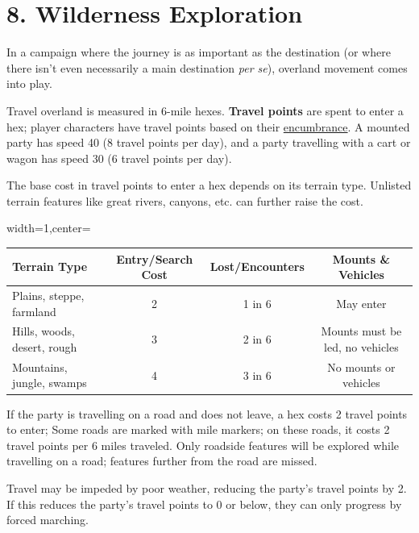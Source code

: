 \documentclass{book}
\begin{document}
\newpage

\section*{8. Wilderness Exploration}\label{wilderness-exploration}

In a campaign where the journey is as important as the destination (or
where there isn't even necessarily a main destination \emph{per se}),
overland movement comes into play.

Travel overland is measured in 6-mile hexes. \textbf{Travel points} are
spent to enter a hex; player characters have travel points based on
their \hyperref[item-slots]{encumbrance}. A mounted party has speed 40
(8 travel points per day), and a party travelling with a cart or wagon
has speed 30 (6 travel points per day).

The base cost in travel points to enter a hex depends on its terrain
type. Unlisted terrain features like great rivers, canyons, etc. can
further raise the cost.

\begin{table}[ht]
	\centering
	\begin{adjustbox}{width=1\textwidth,center=\textwidth}
	\begin{tabular}{lccc}
		\toprule
		Terrain Type & 
		Entry/Search Cost & 
		Lost/Encounters & 
		Mounts \& Vehicles \\
		\midrule
		Plains, steppe, farmland & 2 & 1 in 6 & May enter \\
		Hills, woods, desert, rough & 3 & 2 in 6 & Mounts must be led, no
		vehicles \\
		Mountains, jungle, swamps & 4 & 3 in 6 & No mounts or vehicles \\
		\bottomrule
	\end{tabular}
	\end{adjustbox}
\end{table}

If the party is travelling on a road and does not leave, a hex costs 2
travel points to enter; Some roads are marked with mile markers; on
these roads, it costs 2 travel points per 6 miles traveled. Only
roadside features will be explored while travelling on a road; features
further from the road are missed.

Travel may be impeded by poor weather, reducing the party's travel
points by 2. If this reduces the party's travel points to 0 or below,
they can only progress by forced marching.
\end{document}
